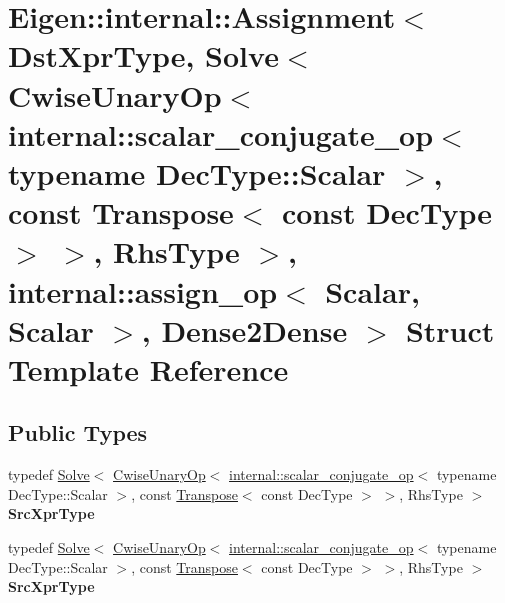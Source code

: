 \hypertarget{struct_eigen_1_1internal_1_1_assignment_3_01_dst_xpr_type_00_01_solve_3_01_cwise_unary_op_3_01in7a0cdfc0a6924bfcd9bc281e374a4ff8}{}\section{Eigen\+:\+:internal\+:\+:Assignment$<$ Dst\+Xpr\+Type, Solve$<$ Cwise\+Unary\+Op$<$ internal\+:\+:scalar\+\_\+conjugate\+\_\+op$<$ typename Dec\+Type\+:\+:Scalar $>$, const Transpose$<$ const Dec\+Type $>$ $>$, Rhs\+Type $>$, internal\+:\+:assign\+\_\+op$<$ Scalar, Scalar $>$, Dense2\+Dense $>$ Struct Template Reference}
\label{struct_eigen_1_1internal_1_1_assignment_3_01_dst_xpr_type_00_01_solve_3_01_cwise_unary_op_3_01in7a0cdfc0a6924bfcd9bc281e374a4ff8}
\subsection*{Public Types}
\begin{DoxyCompactItemize}
\item 
\mbox{\label{struct_eigen_1_1internal_1_1_assignment_3_01_dst_xpr_type_00_01_solve_3_01_cwise_unary_op_3_01in7a0cdfc0a6924bfcd9bc281e374a4ff8_aca0119603485d050980a0b80e38bf298}} 
typedef \hyperlink{group___core___module_class_eigen_1_1_solve}{Solve}$<$ \hyperlink{group___core___module_class_eigen_1_1_cwise_unary_op}{Cwise\+Unary\+Op}$<$ \hyperlink{struct_eigen_1_1internal_1_1scalar__conjugate__op}{internal\+::scalar\+\_\+conjugate\+\_\+op}$<$ typename Dec\+Type\+::\+Scalar $>$, const \hyperlink{group___core___module_class_eigen_1_1_transpose}{Transpose}$<$ const Dec\+Type $>$ $>$, Rhs\+Type $>$ {\bfseries Src\+Xpr\+Type}
\item 
\mbox{\label{struct_eigen_1_1internal_1_1_assignment_3_01_dst_xpr_type_00_01_solve_3_01_cwise_unary_op_3_01in7a0cdfc0a6924bfcd9bc281e374a4ff8_aca0119603485d050980a0b80e38bf298}} 
typedef \hyperlink{group___core___module_class_eigen_1_1_solve}{Solve}$<$ \hyperlink{group___core___module_class_eigen_1_1_cwise_unary_op}{Cwise\+Unary\+Op}$<$ \hyperlink{struct_eigen_1_1internal_1_1scalar__conjugate__op}{internal\+::scalar\+\_\+conjugate\+\_\+op}$<$ typename Dec\+Type\+::\+Scalar $>$, const \hyperlink{group___core___module_class_eigen_1_1_transpose}{Transpose}$<$ const Dec\+Type $>$ $>$, Rhs\+Type $>$ {\bfseries Src\+Xpr\+Type}
\end{DoxyCompactItemize}
